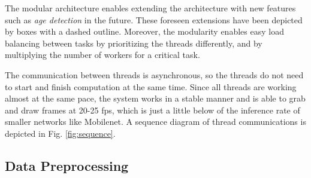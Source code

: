 \documentclass[conference]{IEEEtran}
\begin{document}
\iffalse

\texttt{Jani: Please try to elaborate what you mean by 'connections in reality (below) }

The connections between the main thread and the smile detector thread (and other possible threads) are shown with striped line arrows in the figure. As well, the connections with different modules in the main thread are shown with continuous line arrows.

\fi

The modular architecture enables extending the architecture with new features such as \textit{age detection} in the future. These foreseen extensions have been depicted by boxes with a dashed outline. Moreover, the modularity enables easy load balancing between tasks by prioritizing the threads differently, and by multiplying the number of workers for a critical task.

\iffalse

\texttt{Jani: I do not understand the text below in context what was written above. Above it says that the software is multithreaded, but below it is stated that the various modules could be implemented in separate threads. Which one of these is true?}

The general flow of data in our use case is the following. First, we are grabbing frames in the main thread (grabbing module could be implemented as a separate thread). Secondly, the detection thread finds the location of all faces in the processed frame. After this, the smile detection thread will receive the most recent face-detected frame and will be able to predict the probability of smile  for the detected faces. In the final step we visualize the results by overlying the detection result on top of the most recent grabbed frame. See Fig. \ref{fig:sequence} for illustration.

\fi


The communication between threads is asynchronous, so the threads do not need to start and finish computation at the same time. Since all threads are working almost at the same pace, the system works in a stable manner and is able to grab and draw frames at 20-25 fps, which is just a little below of the inference rate of smaller networks like Mobilenet. A sequence diagram of thread communications is depicted in Fig. \ref{fig:sequence}.

\subsection{Data Preprocessing}
\end{document}
